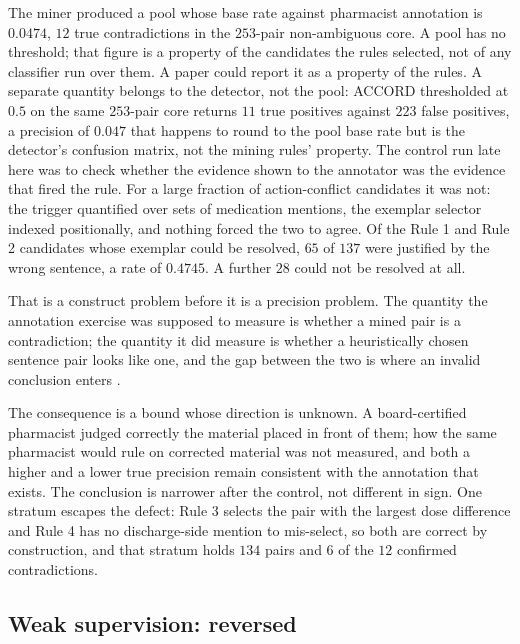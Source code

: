 The miner produced a pool whose base rate against pharmacist annotation is
$0.0474$, $12$ true contradictions in the $253$-pair non-ambiguous core. A pool
has no threshold; that figure is a property of the candidates the rules
selected, not of any classifier run over them. A paper could report it as a
property of the rules. A separate quantity belongs to the detector, not the
pool: ACCORD thresholded at $0.5$ on the same $253$-pair core returns $11$ true
positives against $223$ false positives, a precision of $0.047$ that happens to
round to the pool base rate but is the detector's confusion matrix, not the
mining rules' property. The control run late here was to check whether the evidence shown
to the annotator was the evidence that fired the rule. For a large fraction of
action-conflict candidates it was not: the trigger quantified over sets of
medication mentions, the exemplar selector indexed positionally, and nothing
forced the two to agree. Of the Rule 1 and Rule 2 candidates whose
exemplar could be resolved, $65$ of $137$ were justified by the wrong sentence, a
rate of $0.4745$. A further $28$ could not be resolved at all.

That is a construct problem before it is a precision problem. The quantity the
annotation exercise was supposed to measure is whether a mined pair is a
contradiction; the quantity it did measure is whether a heuristically chosen
sentence pair looks like one, and the gap between the two is where an invalid
conclusion enters \citep{jacobs2021measurement}.

The consequence is a bound whose direction is unknown. A board-certified
pharmacist judged correctly the material placed in front of them; how the same
pharmacist would rule on corrected material was not measured, and both a higher
and a lower true precision remain consistent with the annotation that exists. The
conclusion is narrower after the control, not different in sign. One stratum
escapes the defect: Rule 3 selects the pair with the largest dose difference and
Rule 4 has no discharge-side mention to mis-select, so both are correct by
construction, and that stratum holds $134$ pairs and $6$ of the $12$ confirmed
contradictions.

\subsection{Weak supervision: reversed}

